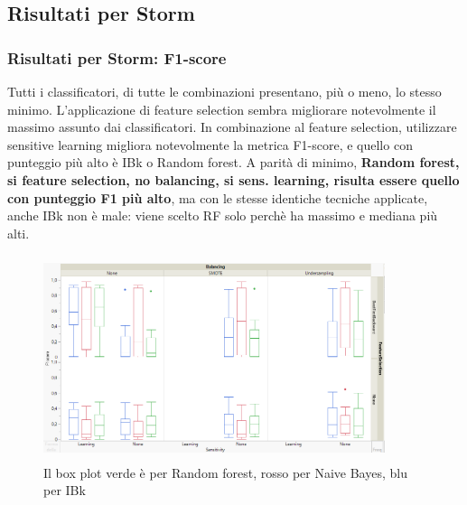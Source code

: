 \documentclass{beamer}
\begin{document}
\subsection{Risultati per Storm}
\begin{frame}
	\frametitle{Risultati per Storm: F1-score}
	
	\fontsize{7pt}{8pt}\selectfont
	
	Tutti i classificatori, di tutte le combinazioni presentano, più o meno, lo stesso minimo.	
	L'applicazione di feature selection sembra migliorare notevolmente il massimo assunto dai classificatori.
	In combinazione al feature selection, utilizzare sensitive learning migliora notevolmente la metrica 
	F1-score, e quello con punteggio più alto è IBk o Random forest.
	A parità di minimo, \textbf{Random forest, si feature selection, no balancing, si sens. learning, risulta
	essere quello con punteggio F1 più alto}, ma con le stesse identiche tecniche applicate, anche IBk non
	è male: viene scelto RF solo perchè ha massimo e mediana più alti.
	
	\centering
	\begin{figure}
	\includegraphics[width=10cm, height=6cm]{storm-f1score}
	\caption{Il box plot verde è per Random forest, rosso per Naive Bayes, blu per IBk}
	\end{figure}
\end{frame}
\end{document}
